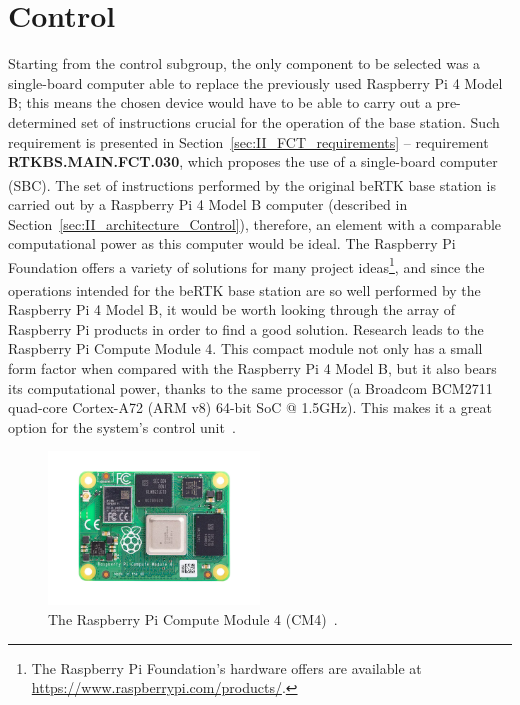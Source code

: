 \section{Control}\label{sec:311_Control}

Starting from the control subgroup, the only component to be selected was a single-board computer able to replace the previously used Raspberry Pi 4 Model B; this means the chosen device would have to be able to carry out a pre-determined set of instructions crucial for the operation of the base station. Such requirement is presented in Section~\ref{sec:II_FCT_requirements} -- requirement \textbf{RTKBS.MAIN.FCT.030}, which proposes the use of a single-board computer (SBC).
The set of instructions performed by the original beRTK\textsuperscript{\textregistered} base station is carried out by a Raspberry Pi 4 Model B computer (described in Section~\ref{sec:II_architecture_Control}), therefore, an element with a comparable computational power as this computer would be ideal. The Raspberry Pi Foundation offers a variety of solutions for many project ideas\footnote[14]{The Raspberry Pi Foundation's hardware offers are available at \url{https://www.raspberrypi.com/products/}.}, and since the operations intended for the beRTK\textsuperscript{\textregistered} base station are so well performed by the Raspberry Pi 4 Model B, it would be worth looking through the array of Raspberry Pi products in order to find a good solution. Research leads to the Raspberry Pi Compute Module 4.
This compact module not only has a small form factor when compared with the Raspberry Pi 4 Model B, but it also bears its computational power, thanks to the same processor (a Broadcom BCM2711 quad-core Cortex-A72 (ARM v8) 64-bit SoC @ 1.5GHz). This makes it a great option for the system's control unit~\cite{CM4}.

\begin{figure}[h]
	\centering
	\includegraphics[width=0.5\textwidth]{Chapters/Figures/CM4.png}
	\caption{The Raspberry Pi Compute Module 4 (CM4)~\cite{CM4}.}
	\label{fig:CM4}
\end{figure}

